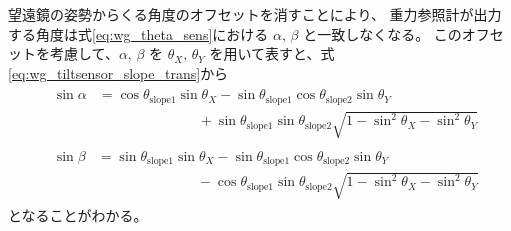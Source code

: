 \documentclass[../../main.tex]{subfiles}
\begin{document}
望遠鏡の姿勢からくる角度のオフセットを消すことにより、
重力参照計が出力する角度は式\eqref{eq:wg_theta_sens}における $\alpha,\,\beta$ と一致しなくなる。
このオフセットを考慮して、$\alpha,\,\beta$ を $\theta_X,\,\theta_Y$ を用いて表すと、式\eqref{eq:wg_tiltsensor_slope_trans}から
\begin{align}
    &\begin{split}
        \sin\alpha &= \cos\theta_{\mathrm{slope}1}\sin\theta_{X}-\sin\theta_{\mathrm{slope}1}\cos\theta_{\mathrm{slope}2}\sin\theta_{Y} \\
                   &\hspace{3cm} +\sin\theta_{\mathrm{slope}1}\sin\theta_{\mathrm{slope}2}\sqrt{1-\sin^2\theta_{X}-\sin^2\theta_{Y}}
    \end{split}
    \label{eq:wg_tiltsensor_slope1} \\
    &\begin{split}
        \sin\beta &= \sin\theta_{\mathrm{slope}1}\sin\theta_{X}-\sin\theta_{\mathrm{slope}1}\cos\theta_{\mathrm{slope}2}\sin\theta_{Y} \\
                  &\hspace{3cm}-\cos\theta_{\mathrm{slope}1}\sin\theta_{\mathrm{slope}2}\sqrt{1-\sin^2\theta_{X}-\sin^2\theta_{Y}}
    \end{split}
    \label{eq:wg_tiltsensor_slope2}
\end{align}
となることがわかる。
\end{document}
